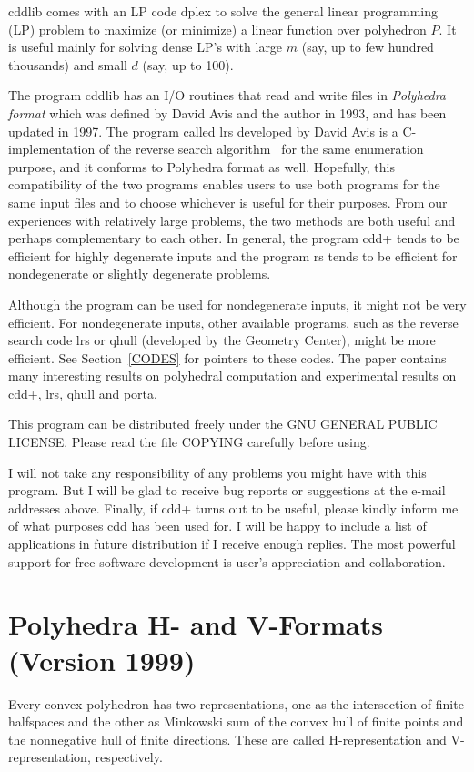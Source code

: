 \documentclass[11pt]{article}
\newcommand {\0} {{\bf 0}}
\begin{document}
cddlib comes with an LP code dplex to solve the general
linear programming (LP) problem to maximize (or minimize) a linear
function over polyhedron $P$.   It is useful mainly for solving 
dense LP's with large $m$ (say, up to few hundred thousands) and small $d$ 
(say, up to 100).

The program cddlib has an I/O routines that read and write files in 
{\em Polyhedra format\/} which was defined by David Avis and
the author in 1993, and has been updated in 1997.  
The program called lrs \cite{a-uglrs-97} developed by David Avis is
a C-implementation of the reverse search algorithm~\cite{af-pachv-92} 
for the same enumeration purpose, and it conforms to Polyhedra format as well.
Hopefully, this compatibility of the two programs
enables users to use both programs for the same input files
and to choose whichever is useful for their purposes.
From our experiences with relatively large problems,
the two methods are both useful and perhaps complementary
to each other.  In general, the program cdd+ tends to be
efficient for highly degenerate inputs and the program rs
tends to be efficient for nondegenerate or slightly
degenerate problems.

Although the program can be used for nondegenerate inputs,
it might not be very efficient.  For nondegenerate inputs, 
other available programs, such as the reverse search code lrs or
qhull (developed by the Geometry Center),
might be more efficient.  See Section~\ref{CODES} 
for pointers to these codes.  
The paper \cite{abs-hgach-97} contains many interesting results on polyhedral
computation and experimental results on cdd+, lrs, qhull and porta.

This program can be distributed freely under the GNU GENERAL PUBLIC LICENSE.
Please read the file COPYING carefully before using.

I will not take any responsibility of any problems you might have
with this program.  But I will be glad to receive bug reports or suggestions
at the e-mail addresses above.  Finally, if cdd+ turns out to be useful, 
please kindly inform  me of  what purposes cdd has been used for. 
I will be happy to include a list of applications in future
distribution  if I receive  enough replies.
The most powerful support for free software development
is user's appreciation and collaboration.

\section{Polyhedra H- and V-Formats (Version 1999)} \label{FORMAT}
\bigskip
Every convex polyhedron has two representations, one as
the intersection of finite halfspaces and the other
as Minkowski sum of the convex hull of finite points
and the nonnegative hull of finite directions.  These are
called H-representation and V-representation, respectively.
\end{document}

